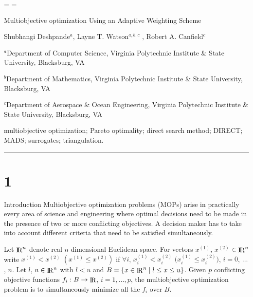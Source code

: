 \rn \AD
\rn \ASZ
\rn \ASZI
\rn \C
\rn \D
\rn \DD
\rn \DPAM
\rn \DT
\rn \DWC
\rn \E
\rn \GF
\rn \GSG
\rn \HWRSVJBT
\rn \JPS
\rn \KWT
\rn \MM
\rn \RKW
\rn \TZWBIB
\rn \VL
\rn \WCSF
\rn \WIHM

\headline={\hfil}
\footline={\hfil}

\centerline{\bfXIV Multiobjective optimization Using an Adaptive Weighting Scheme}
\vskip 1.2pc
\centerline{\rmXII Shubhangi Deshpande{$^a$}, Layne T. Watson{$^{a,b,c}$
}, Robert A. Canfield$^c$}
\smallskip
\centerline{\rmVIII $^a$Department of Computer Science, Virginia Polytechnic 
Institute \& State University, Blacksburg, VA}
\centerline{\rmVIII $^b$Department of Mathematics, Virginia Polytechnic 
Institute \& State University, Blacksburg, VA}
\centerline{\rmVIII $^c$Department of Aerospace \& Ocean Engineering, Virginia 
Polytechnic Institute \& State University, Blacksburg, VA}
\bigskip

\smallskip
\noindent 
\bigskip{} multiobjective optimization; Pareto 
optimality; direct search method; DIRECT; MADS; surrogates; triangulation.
\smallskip
\hrule
\smallskip
%
%

\section{1}{Introduction}%
Multiobjective optimization problems (MOPs) arise in practically every area  
of science and engineering where optimal decisions need to be made in 
the presence of two or more conflicting objectives. A decision maker has to 
take into account different criteria that need to be satisfied
simultaneously.

Let $\mathop{\rm I}\!\!\mathop{\rm R}\nolimits^n$ denote real $n$-dimensional Euclidean space. For vectors $x^{(1)}$, 
$x^{(2)}$ $\in \mathop{\rm I}\!\!\mathop{\rm R}\nolimits^n$ write $x^{(1)} < x^{(2)}$ $(x^{(1)}\le x^{(2)})$ if 
$\forall i$, $x^{(1)}_i<x^{(2)}_i$ $\bigl(x^{(1)}_i\le x^{(2)}_i\bigr)$, $i=0$,
$\ldots$, $n$. Let $l$, $u \in \mathop{\rm I}\!\!\mathop{\rm R}\nolimits^n$ with $l < u$ and $B = \{ x \in \mathop{\rm I}\!\!\mathop{\rm R}\nolimits^n \mid
l\le x\le u\}$. Given $p$ conflicting objective functions $f_i: B \to \mathop{\rm I}\!\!\mathop{\rm R}\nolimits$,
$i=1,\ldots,p$, the multiobjective optimization problem is to simultaneously
minimize all the $f_i$ over $B$.

